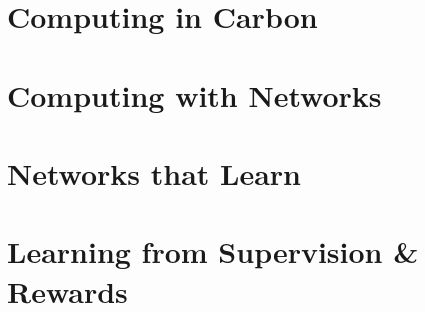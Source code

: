 \documentclass[]{article}
\begin{document}
\section{Computing in Carbon}\label{sec:week5}

\section{Computing with Networks}\label{sec:week6}

\section{Networks that Learn}\label{sec:week7}

\section{Learning from Supervision \& Rewards}\label{sec:week8}

\appendix

\printglossaries




\end{document}
